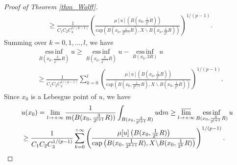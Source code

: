 \documentclass[10pt,a4paper]{amsart}
\newcommand{\einf}{\operatorname*{ess\,inf}}
\begin{document}
\begin{proof}[Proof of Theorem \ref{thm_Wolff}]
\begin{align*}
&\ge\frac{1}{C_1C_2C_3^{1/(p-1)}}\left(\frac{\mu[u]\left(B(x_0,\frac{1}{2^{k}}R)\right)}{\mathrm{cap}\left(B(x_0,\frac{1}{2^{k+1}}R),X\backslash B(x_0,\frac{1}{2^{k}}R)\right)}\right)^{1/(p-1)}.
\end{align*}
Summing over $k=0,1,\ldots,l$, we have
\begin{align*}
&\einf_{B(x_0,\frac{3}{2^{l+1}}R)}u\ge \einf_{B(x_0,\frac{3}{2^{l+1}}R)}u-\einf_{B(x_0,{3}R)}u\\
&\ge\frac{1}{C_1C_2C_3^{1/(p-1)}}\sum_{k=0}^l\left(\frac{\mu[u]\left(B(x_0,\frac{1}{2^{k}}R)\right)}{\mathrm{cap}\left(B(x_0,\frac{1}{2^{k+1}}R),X\backslash B(x_0,\frac{1}{2^{k}}R)\right)}\right)^{1/(p-1)}.
\end{align*}
Since $x_0$ is a Lebesgue point of $u$, we have
\begin{align*}
&u(x_0)=\lim_{l\to+\infty}\frac{1}{m({B(x_0,\frac{3}{2^{l+1}}R)})}\int_{{B(x_0,\frac{3}{2^{l+1}}R)}}u\mathrm{d} m\ge\varlimsup_{l\to+\infty}\einf_{B(x_0,\frac{3}{2^{l+1}}R)}u\\
&\ge\frac{1}{C_1C_2C_3^{1/(p-1)}}\sum_{k=0}^{+\infty}\left(\frac{\mu[u]\left(B(x_0,\frac{1}{2^{k}}R)\right)}{\mathrm{cap}\left(B(x_0,\frac{1}{2^{k+1}}R),X\backslash B(x_0,\frac{1}{2^{k}}R)\right)}\right)^{1/(p-1)}.
\end{align*}


\end{proof}
\end{document}
